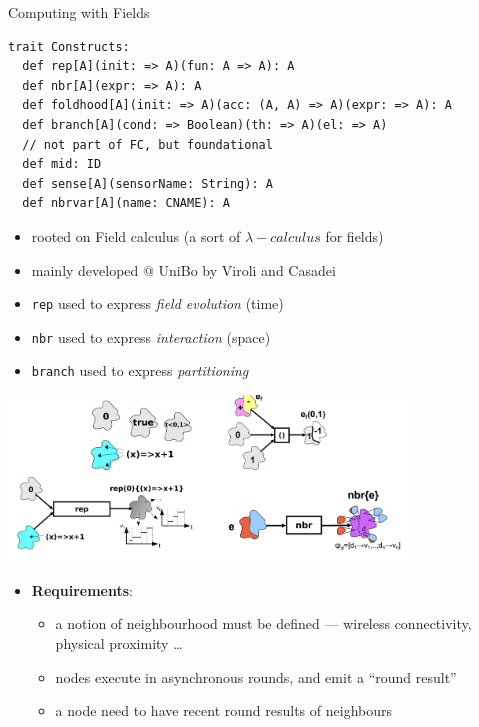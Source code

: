 \documentclass[8pt, aspectratio=169, handout]{beamer}
\begin{document}
\begin{frame}{Computing with Fields}
  \begin{card}
    \begin{verbatim}
trait Constructs:
  def rep[A](init: => A)(fun: A => A): A
  def nbr[A](expr: => A): A
  def foldhood[A](init: => A)(acc: (A, A) => A)(expr: => A): A
  def branch[A](cond: => Boolean)(th: => A)(el: => A)
  // not part of FC, but foundational
  def mid: ID
  def sense[A](sensorName: String): A
  def nbrvar[A](name: CNAME): A
    \end{verbatim}
\begin{itemize}
  \item rooted on Field calculus (a sort of $\lambda-calculus$ for fields)
  \item mainly developed @ UniBo by Viroli and Casadei
  \item \texttt{rep} used to express \emph{field evolution} (time)
  \item \texttt{nbr} used to express \emph{interaction} (space)
  \item \texttt{branch} used to express \emph{partitioning}
\end{itemize}
  \end{card}
\framebreak
\begin{card}
  \centering
  \includegraphics[width=0.8\textwidth]{img/high-level-examples.png}
\end{card}
\begin{card}
  \begin{itemize}
    \item \textbf{Requirements}:
    \begin{itemize}
      \item a notion of neighbourhood must be defined — wireless connectivity, physical proximity \dots
      \item nodes execute in asynchronous rounds, and emit a ``round result''
      \item a node need to have recent round results of neighbours

\end{itemize}
\end{itemize}
\end{card}
\end{frame}
\end{document}
